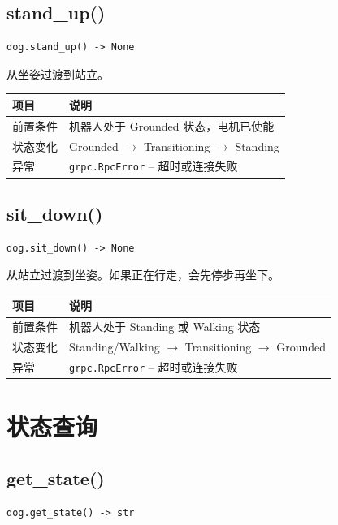 \documentclass[a4paper,11pt,openany]{book}
\begin{document}
\subsection{stand\_up()}

\begin{lstlisting}[style=python,numbers=none]
dog.stand_up() -> None
\end{lstlisting}

从坐姿过渡到站立。

\begin{longtable}{ll}
\toprule
项目 & 说明 \\
\midrule
\endhead
前置条件 & 机器人处于 Grounded 状态，电机已使能 \\
状态变化 & Grounded $\to$ Transitioning $\to$ Standing \\
异常 & \texttt{grpc.RpcError} -- 超时或连接失败 \\
\bottomrule
\end{longtable}

\subsection{sit\_down()}

\begin{lstlisting}[style=python,numbers=none]
dog.sit_down() -> None
\end{lstlisting}

从站立过渡到坐姿。如果正在行走，会先停步再坐下。

\begin{longtable}{ll}
\toprule
项目 & 说明 \\
\midrule
\endhead
前置条件 & 机器人处于 Standing 或 Walking 状态 \\
状态变化 & Standing/Walking $\to$ Transitioning $\to$ Grounded \\
异常 & \texttt{grpc.RpcError} -- 超时或连接失败 \\
\bottomrule
\end{longtable}

\section{状态查询}

\subsection{get\_state()}

\begin{lstlisting}[style=python,numbers=none]
dog.get_state() -> str
\end{lstlisting}
\end{document}
